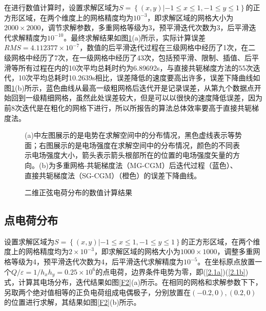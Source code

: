 \documentclass{article} %
\begin{document}
在进行数值计算时，设置求解区域为$S=\left\{(x,y)|-1\leq x\leq 1,-1\leq y\leq 1\right\}$的正方形区域，在两个维度上的网格精度均为$10^{-3}$，即求解区域的网格大小为$2000\times 2000$，调节求解参数，多重网格等级为3，预平滑迭代次数为3，后平滑迭代求解精度为$10^{-10}$。最终求解结果如图\ref{F1}(a)所示，实际计算误差$RMS=4.112377\times 10^{-7}$，数值的后平滑迭代过程在三级网格中经历了1次，在二级网格中经历了7次，在一级网格中经历了43次，包括预平滑、限制、插值、后平滑等所有过程在内的10次平均总耗时约为6.89692s，与直接共轭梯度方法的55次迭代，10次平均总耗时10.2639s相比，误差降低的速度要高出许多，误差下降曲线如图\ref{F1}(b)所示，蓝色曲线从最高一级粗网格后迭代开是记录误差，从第九个数据点开始回到一级精细网格，虽然此处误差较大，但是可以以很快的速度降低误差，因为前8次迭代是在粗化的网格下进行，所以所报告的算法总体效率要高于直接共轭梯度法。
\begin{figure}[ht]
    \begin{center}
    \end{center}
    \small
    \qquad (a)中左图展示的是电势在求解空间中的分布情况，黑色虚线表示等势面；右图展示的是电场强度在求解空间中的分布情况，颜色的不同表示电场强度大小，箭头表示箭头根部所在的位置的电场强度矢量的方向。(b)为多重网格-共轭梯度法（MG-CGM）后迭代过程（蓝色）、直接共轭梯度法（SG-CGM）（橙色）的误差下降曲线。
    \caption{二维正弦电荷分布的数值计算结果}
    \label{F1}
\end{figure}

\subsection{点电荷分布}
设置求解区域为$S=\left\{(x,y)|-1\leq x\leq 1,-1\leq y\leq 1\right\}$的正方形区域，在两个维度上的网格精度均为$2\times 10^{-3}$，即求解区域的网格大小为$1000\times 1000$，调整多重网格等级为4，预平滑迭代次数为4，后平滑迭代求解精度为$10^{-5}$。在坐标原点放置一个$Q/\varepsilon=1/h_x h_y=0.25\times 10^{6}$的点电荷，边界条件电势为零，即(\ref{2.1a})(\ref{2.1b})式，计算其电场分布，迭代结果如图\ref{F2}(a)所示。在相同的网格和求解参数下下，另取两个绝对值相等的正负电荷组成电偶极子，分别放置在$(-0.2,0),(0.2,0)$的位置进行求解，其结果如图\ref{F2}(b)所示。
\end{document}
